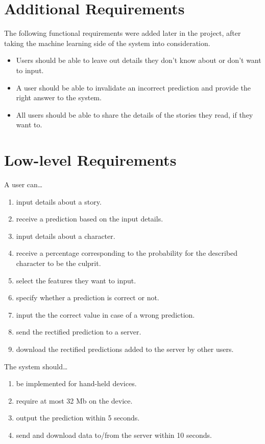 \documentclass{mproj}
\begin{document}
\section{Additional Requirements}
	
The following functional requirements were added later in the project, after taking the machine learning side of the system into consideration.
\begin{itemize}
\item Users should be able to leave out details they don't know about or don't want to input.
\item A user should be able to invalidate an incorrect prediction and provide the right answer to the system. 
\item All users should be able to share the details of the stories they read, if they want to.
\end{itemize}

\section{Low-level Requirements}\label{requirements}
	
A user can\ldots
\begin{enumerate}\label{user_stories}
	\item input details about a story.
	\item receive a prediction based on the input details.
	\item input details about a character.
	\item receive a percentage corresponding to the probability for the described character to be the culprit.
	\item select the features they want to input.
	\item specify whether a prediction is correct or not.
	\item input the the correct value in case of a wrong prediction.
	\item send the rectified prediction to a server.
	\item download the rectified predictions added to the server by other users. \par
\end{enumerate}

The system should\ldots
\begin{enumerate}\label{constraints}
	\item be implemented for hand-held devices.
	\item require at most 32 Mb on the device.
	\item output the prediction within 5 seconds.
	\item send and download data to/from the server within 10 seconds.
\end{enumerate}
\end{document}
